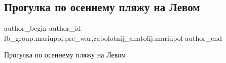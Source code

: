  
 
 
 
 

\subsection{Прогулка по осеннему пляжу на Левом}
\label{sec:04_01_2023.fb.fb_group.mariupol.pre_war.1.progulka_po_osennemu}
 
\ifcmt
 author_begin
   author_id fb_group.mariupol.pre_war,zabolotnij_anatolij.mariupol
 author_end
\fi

Прогулка по осеннему пляжу на Левом
